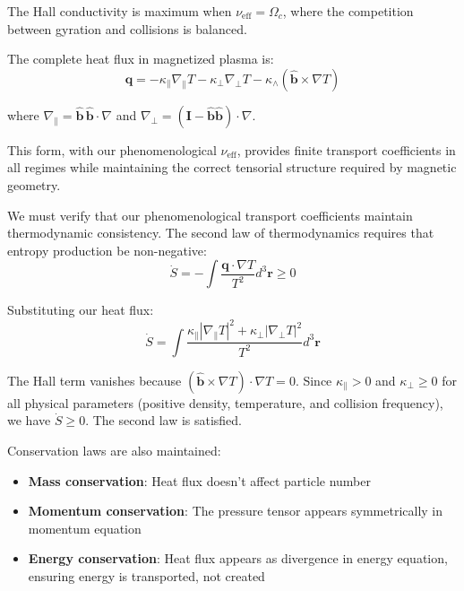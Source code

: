 \documentclass[12pt,a4paper]{article}
\newcommand{\vect}[1]{\mathbf{#1}}
\newcommand{\eff}{\text{eff}}
\begin{document}
The Hall conductivity is maximum when $\nu_{\eff} = \Omega_c$, where the competition between gyration and collisions is balanced.

The complete heat flux in magnetized plasma is:
\begin{equation}
\boxed{\vect{q} = -\kappa_{\parallel} \nabla_{\parallel} T - \kappa_{\perp} \nabla_{\perp} T - \kappa_{\wedge} (\hat{\vect{b}} \times \nabla T)}
\label{eq:q_tensor}
\end{equation}

where $\nabla_{\parallel} = \hat{\vect{b}}\,\hat{\vect{b}} \cdot \nabla$ and $\nabla_{\perp} = (\mathbf{I} - \hat{\vect{b}}\hat{\vect{b}}) \cdot \nabla$.

This form, with our phenomenological $\nu_{\eff}$, provides finite transport coefficients in all regimes while maintaining the correct tensorial structure required by magnetic geometry.

We must verify that our phenomenological transport coefficients maintain thermodynamic consistency. The second law of thermodynamics requires that entropy production be non-negative:
\begin{equation}
\dot{S} = -\int \frac{\vect{q} \cdot \nabla T}{T^2} d^3\vect{r} \geq 0
\label{eq:entropy_prod}
\end{equation}

Substituting our heat flux:
\begin{equation}
\dot{S} = \int \frac{\kappa_{\parallel} |\nabla_{\parallel} T|^2 + \kappa_{\perp} |\nabla_{\perp} T|^2}{T^2} d^3\vect{r}
\label{eq:entropy_production_expanded}
\end{equation}

The Hall term vanishes because $(\hat{\vect{b}} \times \nabla T) \cdot \nabla T = 0$. Since $\kappa_{\parallel} > 0$ and $\kappa_{\perp} \geq 0$ for all physical parameters (positive density, temperature, and collision frequency), we have $\dot{S} \geq 0$. The second law is satisfied.

Conservation laws are also maintained:
\begin{itemize}[leftmargin=*]
\item \textbf{Mass conservation}: Heat flux doesn't affect particle number
\item \textbf{Momentum conservation}: The pressure tensor appears symmetrically in momentum equation
\item \textbf{Energy conservation}: Heat flux appears as divergence in energy equation, ensuring energy is transported, not created
\end{itemize}
\end{document}

